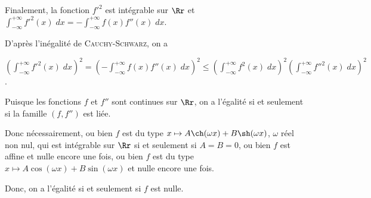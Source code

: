 {{Finalement, la fonction $f'^2$ est intégrable sur $\Rr$ et $\int_{-\infty}^{+\infty}f'^2(x)\;dx =-\int_{-\infty}^{+\infty}f(x)f''(x)\;dx$.

D'après l'inégalité de \textsc{Cauchy}-\textsc{Schwarz}, on a

\begin{center}
$\left(\int_{-\infty}^{+\infty}f'^2(x)\;dx\right)^2=\left(-\int_{-\infty}^{+\infty}f(x)f''(x)\;dx\right)^2\leqslant\left(\int_{-\infty}^{+\infty}f^2(x)\;dx\right)^2\left(\int_{-\infty}^{+\infty}f''^2(x)\;dx\right)^2$.
\end{center}

Puisque les fonctions $f$ et $f''$ sont continues sur $\Rr$, on a l'égalité si et seulement si la famille $(f,f'')$ est liée.

Donc nécessairement, ou bien $f$ est du type $x\mapsto A\ch(\omega x)+ B\sh(\omega x)$, $\omega$ réel non nul, qui est intégrable sur $\Rr$ si et seulement si $A = B = 0$, ou bien $f$ est affine et nulle encore une fois, ou bien $f$ est du type $x\mapsto A\cos(\omega x)+ B\sin(\omega x)$ et nulle encore une fois.

Donc, on a l'égalité si et seulement si $f$ est nulle.
}
}
